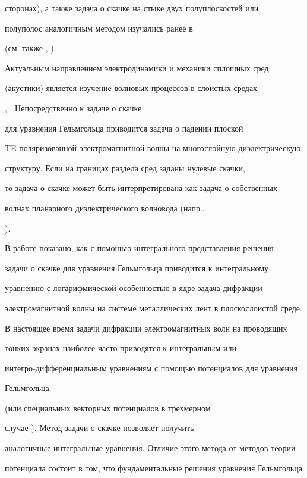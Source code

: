 сторонах), а также задача о скачке на стыке двух полуплоскостей или


полуполос аналогичным методом изучались ранее в \cite{PNB.99.4}


(см. также \cite{PNB.98.1}, \cite{PNB.98.2}).





Актуальным направлением электродинамики и механики сплошных сред


(акустики) является изучение волновых процессов в слоистых средах


\cite{Brh.BCC}, \cite{BPC.TB}. Непосредственно к задаче о скачке


для уравнения Гельмгольца приводится задача о падении плоской


TE-поляризованной электромагнитной волны на многослойную диэлектрическую


структуру. Если на границах раздела сред заданы нулевые скачки,


то задача о скачке может быть интерпретирована как задача о собственных


волнах планарного диэлектрического волновода (напр.,


\cite{Adms.VvTOB}).





В работе показано, как с помощью интегрального представления решения


задачи о скачке для уравнения Гельмгольца приводится к интегральному


уравнению с логарифмической особенностью в ядре задача дифракции


электромагнитной волны на системе металлических лент в плоскослоистой среде.


В настоящее время задачи дифракции электромагнитных волн на проводящих


тонких экранах наиболее часто приводятся к интегральным или


интегро-дифференциальным уравнениям с помощью потенциалов для уравнения


Гельмгольца \cite{XMV.TD}


(или специальных векторных потенциалов в трехмерном


случае \cite{IlSm.DEVPTE}). Метод задачи о скачке позволяет получить


аналогичные интегральные уравнения. Отличие этого метода от методов теории


потенциала состоит в том, что фундаментальные решения уравнения Гельмгольца


